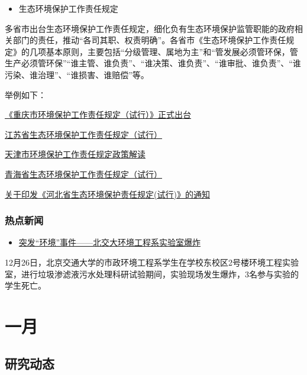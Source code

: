 \documentclass[]{book}
\providecommand{\tightlist}{%
  \setlength{\itemsep}{0pt}\setlength{\parskip}{0pt}}
\begin{document}
\begin{itemize}
\tightlist
\item
  生态环境保护工作责任规定
\end{itemize}

多省市出台生态环境保护工作责任规定，细化负有生态环境保护监管职能的政府相关部门的责任，推动``各司其职、权责明确''。各省市《生态环境保护工作责任规定》的几项基本原则，主要包括``分级管理、属地为主''和``管发展必须管环保，管生产必须管环保''``谁主管、谁负责''、``谁决策、谁负责''、``谁审批、谁负责''、``谁污染、谁治理''、``谁损害、谁赔偿''等。

举例如下：

\href{http://www.cepb.gov.cn/doc/2016/11/25/148053.shtml}{《重庆市环境保护工作责任规定（试行）》正式出台}

\href{http://jsnews2.jschina.com.cn/system/2016/12/26/030319286.shtml}{江苏省生态环境保护工作责任规定（试行）}

\href{http://www.tj.gov.cn/zw/zcjd/201706/t20170630_3605048.html}{天津市环境保护工作责任规定政策解读}

\href{http://www.qh.gov.cn/zwgk/system/2017/07/20/010273792.shtml}{青海省生态环境保护工作责任规定（试行）}

\href{http://www.hebhb.gov.cn/xwzx/szfwj/201709/t20170920_56450.html}{关于印发《河北省生态环境保护责任规定(试行)》的通知}

\hypertarget{ux70edux70b9ux65b0ux95fb-1}{%
\subsubsection*{热点新闻}\label{ux70edux70b9ux65b0ux95fb-1}}

\begin{itemize}
\tightlist
\item
  \href{http://www.njtu.edu.cn/tzgg/159991.htm}{突发``环境''事件------北交大环境工程系实验室爆炸}
\end{itemize}

12月26日，北京交通大学的市政环境工程系学生在学校东校区2号楼环境工程实验室，进行垃圾渗滤液污水处理科研试验期间，实验现场发生爆炸，3名参与实验的学生死亡。

\hypertarget{ux4e00ux6708-1}{%
\section*{一月}\label{ux4e00ux6708-1}}

\hypertarget{ux7814ux7a76ux52a8ux6001-14}{%
\subsection*{研究动态}\label{ux7814ux7a76ux52a8ux6001-14}}
\end{document}
